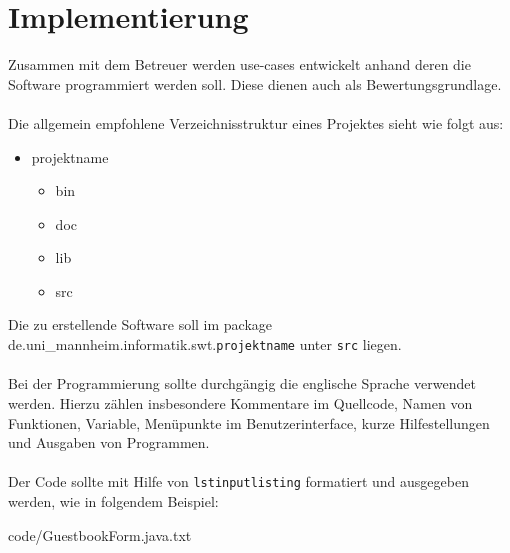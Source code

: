 \chapter{Implementierung}

Zusammen mit dem Betreuer werden use-cases entwickelt anhand deren die
Software programmiert werden soll. Diese dienen auch als Bewertungsgrundlage.\\
\\
Die allgemein empfohlene Verzeichnisstruktur eines Projektes sieht wie folgt
aus:

\begin{itemize}
\item projektname
  \begin{itemize}
  \item bin
  \item doc
  \item lib
  \item src
  \end{itemize}
\end{itemize}

Die zu erstellende Software soll im package
de.uni\_mannheim.informatik.swt.\texttt{projektname} unter \texttt{src} liegen.\\
\\
Bei der Programmierung sollte durchgängig die englische Sprache verwendet
werden. Hierzu zählen insbesondere Kommentare im Quellcode, Namen von
Funktionen, Variable, Menüpunkte im Benutzerinterface, kurze
Hilfestellungen und Ausgaben von Programmen.\\
\\
Der Code sollte mit Hilfe von \texttt{lstinputlisting} formatiert und ausgegeben werden, wie in folgendem Beispiel:


{code/GuestbookForm.java.txt}
